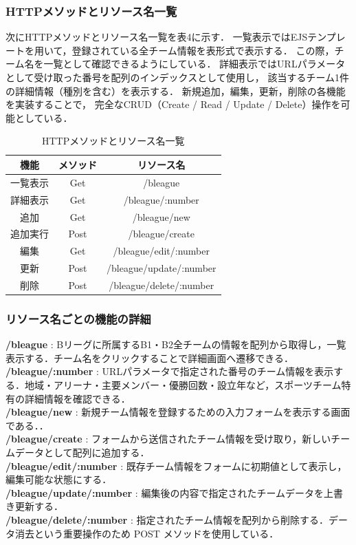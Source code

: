 \documentclass[uplatex,dvipdfmx]{jsarticle}
\begin{document}
\subsubsection{HTTPメソッドとリソース名一覧}
次にHTTPメソッドとリソース名一覧を表4に示す．
一覧表示ではEJSテンプレートを用いて，登録されている全チーム情報を表形式で表示する．
この際，チーム名を一覧として確認できるようにしている．
詳細表示ではURLパラメータとして受け取った番号を配列のインデックスとして使用し，
該当するチーム1件の詳細情報（種別を含む）を表示する．
新規追加，編集，更新，削除の各機能を実装することで，
完全なCRUD（Create / Read / Update / Delete）操作を可能としている．
\begin{table}[H]
    \centering
    \caption{HTTPメソッドとリソース名一覧}
    \label{tab:pulse_comparison}
    \setlength{\extrarowheight}{3pt} 
    \begin{tabular}{|c|c|c|}
        \hline
        機能 & メソッド & リソース名 \\
        \hline
        一覧表示 & Get & /bleague \\
        \hline
        詳細表示 & Get & /bleague/:number \\
        \hline
        追加 & Get & /bleague/new \\
        \hline
        追加実行 & Post & /bleague/create \\
        \hline
        編集 & Get & /bleague/edit/:number \\
        \hline
        更新 & Post & /bleague/update/:number \\
        \hline
        削除 & Post & /bleague/delete/:number \\
        \hline
     \end{tabular}
\end{table}

\subsubsection{リソース名ごとの機能の詳細}
\textbf{/bleague} : Bリーグに所属するB1・B2全チームの情報を配列から取得し，一覧表示する．チーム名をクリックすることで詳細画面へ遷移できる．\\
\textbf{/bleague/:number} : URLパラメータで指定された番号のチーム情報を表示する．地域・アリーナ・主要メンバー・優勝回数・設立年など，スポーツチーム特有の詳細情報を確認できる．\\
\textbf{/bleague/new} : 新規チーム情報を登録するための入力フォームを表示する画面である．．\\
\textbf{/bleague/create} : フォームから送信されたチーム情報を受け取り，新しいチームデータとして配列に追加する．\\
\textbf{/bleague/edit/:number} : 既存チーム情報をフォームに初期値として表示し，編集可能な状態にする．\\
\textbf{/bleague/update/:number} : 編集後の内容で指定されたチームデータを上書き更新する．\\
\textbf{/bleague/delete/:number} : 指定されたチーム情報を配列から削除する．データ消去という重要操作のため POST メソッドを使用している．
\end{document}
